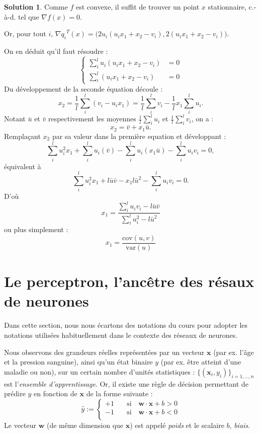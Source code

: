 \documentclass[a4paper,francais]{article}
\newcommand{\cad}{c.-à-d.}
\theoremstyle{definition}
\newtheorem*{solution}{Solution}
\begin{document}
\begin{solution}
  Comme $f$ est convexe, il suffit de trouver un point $x$ stationnaire,
  {\cad} tel que $\nabla f(x) = 0$.

  Or, pour tout $i$, ${\nabla q_i}^T(x) = \big( 2u_i (u_ix_1 + x_2 - v_i), 2(u_ix_1 + x_2 - v_i) \big)$.

  On en déduit qu'il faut résoudre :
  \[
  \left\{
  \begin{array}{cc}
    \sum_i^l u_i (u_ix_1 + x_2 - v_i) &= 0 \\
    \sum_i^l (u_ix_1 + x_2 - v_i) &= 0
  \end{array}
  \right.
  \]
  Du développement de la seconde équation découle :
  \[
  x_2 = \frac{1}{l} \sum_i^l (v_i - u_ix_1) = \frac{1}{l} \sum_i^l v_i - \frac{1}{l} x_1\sum_i^l u_i. 
  \]
  Notant $\bar{u}$ et $\bar{v}$ respectivement les moyennes $\frac{1}{l} \sum_i^l u_i$ et $\frac{1}{l} \sum_i^l v_i$, on a :
  \[
  x_2 = \bar{v} + x_1 \bar{u}.
  \]
  Remplaçant $x_2$ par sa valeur dans la première equation et développant :
  \[
  \sum_i^l u_i^2 x_1 + \sum_i^l u_i (\bar{v}) - \sum_i^l u_i (x_1\bar{u}) - \sum_i^l u_iv_i = 0,
  \]
  équivalent à 
  \[
  \sum_i^l u_i^2 x_1 + l\bar{u}\bar{v} - x_1 l{\bar{u}}^2  - \sum_i^l u_iv_i = 0.
  \]
  D'où
  \[
  x_1 = \frac{\sum_i^l u_iv_i - l\bar{u}\bar{v}}{\sum_i^l u_i^2 - l{\bar{u}}^2}
  \]
  ou plus simplement :
  \[
  x_1 = \frac{ \text{cov}(u,v) }{ \text{var}(u) } 
  \]
  
\end{solution}

\section{Le perceptron, l'ancêtre des résaux de neurones}

\let\vec\mathbf

Dans cette section, nous nous écartons des notations du cours pour adopter les
notations utilisées habituellement dans le contexte des réseaux de neurones.

Nous observons des grandeurs réelles représentées par un vecteur $\vec{x}$
(par ex. l'âge et la pression sanguine), ainsi qu'un état binaire $y$
(par ex. être atteint d'une maladie ou non), sur un certain nombre d'unités
statistiques : $\{(\vec{x}_i,y_i)\}_{i = 1,\dots, n}$ est l'\emph{ensemble d'apprentissage}.
Or, il existe une règle de décision permettant de prédire $y$ en fonction de $\vec{x}$
de la forme suivante :
\[
\hat{y} :=
\left\{
\begin{array}{ll}
  +1 & \quad \mathrm{si}\quad \vec{w}\cdot\vec{x} + b > 0 \\
  -1 & \quad \mathrm{si}\quad \vec{w}\cdot\vec{x} + b < 0 \\
\end{array}
\right.
\]
Le vecteur $\vec{w}$ (de même dimension que $\vec{x}$)
est appelé \emph{poids} et le scalaire $b$, \emph{biais}.
\end{document}
